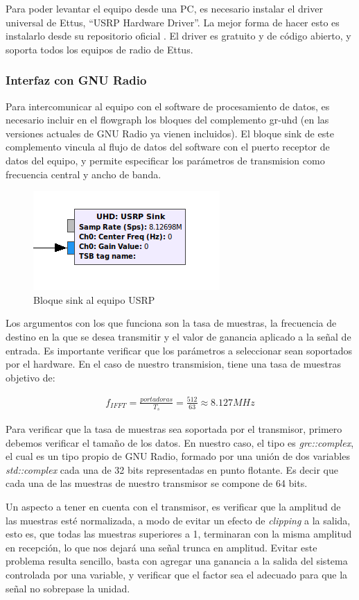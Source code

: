 Para poder levantar el equipo desde una PC, es necesario instalar el driver universal de Ettus, “USRP Hardware Driver”. La mejor forma de hacer esto es instalarlo desde su repositorio oficial \cite{UHD}. El driver es gratuito y de código abierto, y soporta todos los equipos de radio de Ettus.


\subsubsection{Interfaz con GNU Radio}

Para intercomunicar al equipo con el software de procesamiento de datos, es necesario incluir en el flowgraph los bloques del complemento gr-uhd (en las versiones actuales de GNU Radio ya vienen incluidos). El bloque sink de este complemento vincula al flujo de datos del software con el puerto receptor de datos del equipo, y permite especificar los parámetros de transmision como frecuencia central y ancho de banda.

\begin{figure}[h!]
	\centering
	\includegraphics[scale=0.55]{figuras/cap04/sink_block}
	\caption{\label{f:sink_block} Bloque sink al equipo USRP}
\end{figure}

Los argumentos con los que funciona son la tasa de muestras, la frecuencia de destino en la que se desea transmitir y el valor de ganancia aplicado a la señal de entrada. Es importante verificar que los parámetros a seleccionar sean soportados por el hardware. En el caso de nuestro transmision, tiene una tasa de muestras objetivo de:

\begin{gather*}
	f_{IFFT} = \frac{portadoras}{T_{s}} = \frac{512}{63} \approx 8.127 MHz
\end{gather*}

Para verificar que la tasa de muestras sea soportada por el transmisor, primero debemos verificar el tamaño de los datos. En nuestro caso, el tipo es \textit{grc::complex}, el cual es un tipo propio de GNU Radio, formado por una unión de dos variables \textit{std::complex} cada una de 32 bits representadas en punto flotante. Es decir que cada una de las muestras de nuestro transmisor se compone de 64 bits.

Un aspecto a tener en cuenta con el transmisor, es verificar que la amplitud de las muestras esté normalizada, a modo de evitar un efecto de \textit{clipping} a la salida, esto es, que todas las muestras superiores a 1, terminaran con la misma amplitud en recepción, lo que nos dejará una señal trunca en amplitud. Evitar este problema resulta sencillo, basta con agregar una ganancia a la salida del sistema controlada por una variable, y verificar que el factor sea el adecuado para que la señal no sobrepase la unidad.
